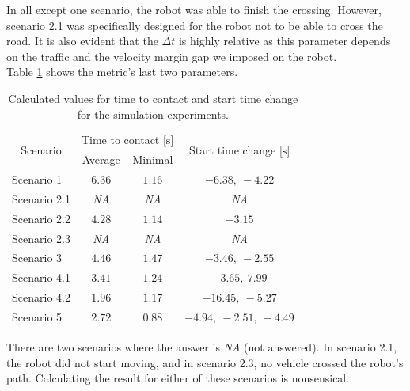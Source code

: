        \noindent In all except one scenario, the robot was able to finish the crossing. However, scenario 2.1 was specifically designed for the robot not to be able to cross the road. It is also evident that the $\Delta t$ is highly relative as this parameter depends on the traffic and the velocity margin gap we imposed on the robot.\\
        Table \ref{tab:times} shows the metric's last two parameters.
        \begin{table}[H]
            \centering
            \begin{tabular}{|c|c c|c|}
                \hline
                \multirow{2}{4em}{Scenario} & \multicolumn{2}{c|}{Time to contact [$\si{\s}$]} & \multirow{2}{9em}{Start time change [$\si{\s}$]}\\
                & Average & Minimal & \\
                \hline\hline
                \multicolumn{1}{|l|}{Scenario 1} & $6.36$ & $1.16$ & $-6.38,\ -4.22$ \\
                \hline
                Scenario 2.1 & \emph{NA} & \emph{NA} & \emph{NA} \\
                \hline
                Scenario 2.2 & $4.28$ & $1.14$ & $-3.15$ \\
                \hline
                Scenario 2.3 & \emph{NA} & \emph{NA} & \emph{NA} \\
                \hline
                \multicolumn{1}{|l|}{Scenario 3} & $4.46$ & $1.47$ & $-3.46,\ -2.55$ \\
                \hline
                Scenario 4.1 & $3.41$ & $1.24$ & $-3.65,\ 7.99$ \\
                \hline
                Scenario 4.2 & $1.96$ & $1.17$ & $-16.45,\ -5.27$ \\
                \hline
                \multicolumn{1}{|l|}{Scenario 5} & $2.72$ & $0.88$ & $-4.94,\ -2.51,\ -4.49$ \\
                \hline
            \end{tabular}
            \caption{Calculated values for time to contact and start time change for the simulation experiments.}
            \label{tab:times}
        \end{table}
        \noindent There are two scenarios where the answer is \emph{NA} (not answered). In scenario 2.1, the robot did not start moving, and in scenario 2.3, no vehicle crossed the robot's path. Calculating the result for either of these scenarios is nonsensical.\\
